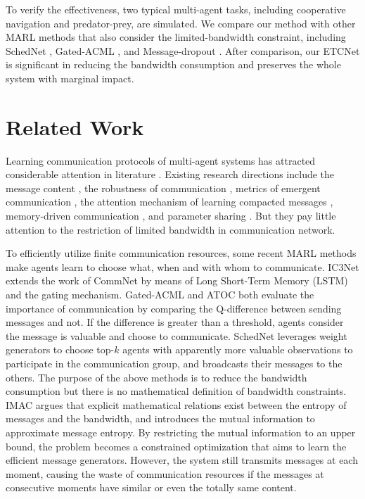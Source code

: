 \documentclass[letterpaper]{article} %
\begin{document}
To verify the effectiveness, two typical multi-agent tasks, including cooperative navigation and predator-prey, are simulated.
We compare our method with other MARL methods that also consider the limited-bandwidth constraint, including SchedNet \cite{schednet}, Gated-ACML \cite{pruning}, and Message-dropout \cite{messagedropout}. After comparison, our ETCNet is significant in reducing the bandwidth consumption and preserves the whole system with marginal impact.




\section{Related Work}\label{sec:relatedWork}


Learning communication protocols of multi-agent systems has attracted considerable attention in literature \cite{accnet, bicnet}. Existing research directions include the message content \cite{a3c2}, the robustness of communication \cite{noisy}, metrics of emergent communication \cite{measure}, the attention mechanism of learning compacted messages \cite{peng2018attention, geng2019attention, daacmp}, memory-driven communication \cite{memorydriven}, and parameter sharing \cite{parashare}. But they pay little attention to the restriction of limited bandwidth in communication network.

To efficiently utilize finite communication resources, some recent MARL methods make agents learn to choose what, when and with whom to communicate. IC3Net \cite{ic3net} extends the work of CommNet \cite{commnet} by means of Long Short-Term Memory (LSTM) and the gating mechanism.
Gated-ACML \cite{pruning} and ATOC \cite{atoc} both evaluate the importance of communication by comparing the Q-difference between sending messages and not. If the difference is
greater than a threshold, agents consider the message is valuable and choose to communicate.
SchedNet \cite{schednet} leverages weight generators to choose top-$k$ agents with apparently more valuable observations to participate in the communication group, and broadcasts their messages to the others.
The purpose of the above methods is to reduce the bandwidth consumption but there is no mathematical definition of bandwidth constraints.
IMAC \cite{imac} argues that explicit mathematical relations exist between the entropy of messages and the bandwidth, and introduces the mutual information to approximate message entropy. By restricting the mutual information to an upper bound, the problem becomes a constrained optimization that aims to learn the efficient message generators. However, the system still transmits messages at each moment, causing the waste of communication resources if the messages at consecutive moments have similar or even the totally same content.
\end{document}
